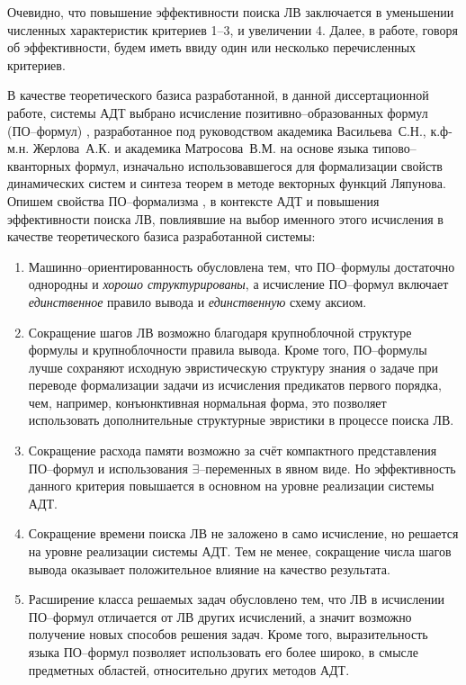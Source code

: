 Очевидно, что повышение эффективности поиска ЛВ заключается в уменьшении численных характеристик критериев 1--3, и увеличении 4. Далее, в работе, говоря об эффективности, будем иметь ввиду один или несколько перечисленных критериев. 


В качестве теоретического базиса разработанной, в данной диссертационной работе, системы АДТ выбрано исчисление позитивно--образованных формул (ПО--формул) \cite{ICDS2000, Vas1995}, разработанное под руководством академика Васильева~С.Н., к.ф-м.н. Жерлова~А.К. и академика Матросова~В.М. на основе языка типово--кванторных формул, изначально использовавшегося для формализации свойств динамических систем и синтеза теорем в методе векторных функций Ляпунова. Опишем свойства ПО--формализма \cite{ICDS2000}, в контексте АДТ и повышения эффективности поиска ЛВ, повлиявшие на выбор именного этого исчисления в качестве теоретического базиса разработанной системы:
\begin{enumerate}
\item {Машинно--ориентированность} обусловлена тем, что ПО--формулы достаточно однородны и \emph{хорошо структурированы}, а исчисление ПО--формул включает \emph{единственное} правило вывода и \emph{единственную} схему аксиом.
\item {Сокращение шагов ЛВ} возможно благодаря крупноблочной структуре формулы и крупноблочности правила вывода. Кроме того, ПО--формулы лучше сохраняют исходную эвристическую структуру знания о задаче при переводе формализации задачи из исчисления предикатов первого порядка, чем, например, конъюнктивная нормальная форма, это позволяет использовать дополнительные структурные эвристики в процессе поиска ЛВ. 
\item {Сокращение расхода памяти} возможно за счёт компактного представления ПО--формул и использования $\exists$--переменных в явном виде. Но эффективность данного критерия повышается в основном на уровне реализации системы АДТ.
\item {Сокращение времени поиска ЛВ} не заложено в само исчисление, но решается на уровне реализации системы АДТ. Тем не менее, сокращение числа шагов вывода оказывает положительное влияние на качество результата.
\item {Расширение класса решаемых задач} обусловлено тем, что ЛВ в исчислении ПО--формул отличается от ЛВ других исчислений, а значит возможно получение новых способов решения задач. Кроме того, выразительность языка ПО--формул позволяет использовать его более широко, в смысле предметных областей, относительно других методов АДТ. 
\end{enumerate}

